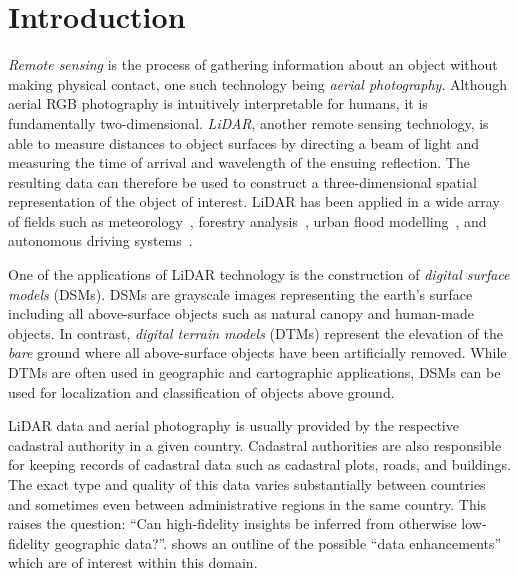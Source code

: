 \section*{Introduction}
\setcounter{page}{1}  %

\textit{Remote sensing} is the process of gathering information about an object without making physical contact, one such technology being \textit{aerial photography}.
Although aerial RGB photography is intuitively interpretable for humans, it is fundamentally two-dimensional.
\textit{LiDAR}, another remote sensing technology, is able to measure distances to object surfaces by directing a beam of light and measuring the time of arrival and wavelength of the ensuing reflection.
The resulting data can therefore be used to construct a three-dimensional spatial representation of the object of interest.
LiDAR has been applied in a wide array of fields such as meteorology~\cite{lidar_meteorology_1966}, forestry analysis~\cite{lidar_forestry_2000}, urban flood modelling~\cite{lidar_flood_2013}, and autonomous driving systems~\cite{lidar_self_driving_2018}.

One of the applications of LiDAR technology is the construction of \textit{digital surface models} (DSMs).
DSMs are grayscale images representing the earth's surface including all above-surface objects such as natural canopy and human-made objects.
In contrast, \textit{digital terrain models} (DTMs) represent the elevation of the \textit{bare} ground where all above-surface objects have been artificially removed.
While DTMs are often used in geographic and cartographic applications, DSMs can be used for localization and classification of objects above ground.

LiDAR data and aerial photography is usually provided by the respective cadastral authority in a given country.
Cadastral authorities are also responsible for keeping records of cadastral data such as cadastral plots, roads, and buildings.
The exact type and quality of this data varies substantially between countries and sometimes even between administrative regions in the same country.
This raises the question: \enquote{Can high-fidelity insights be inferred from otherwise low-fidelity geographic data?}.
 shows an outline of the possible \enquote{data enhancements} which are of interest within this domain. %

